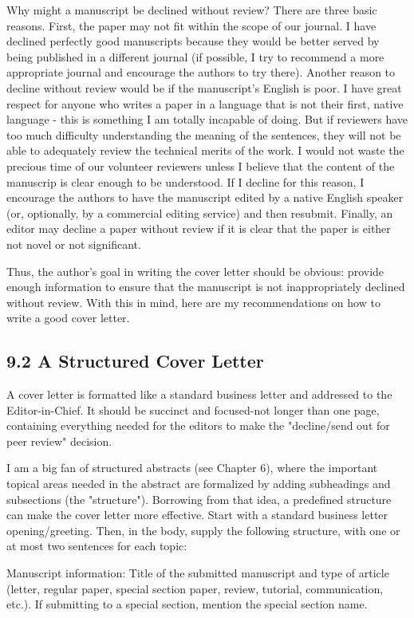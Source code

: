 Why might a manuscript be declined without review? There are three basic reasons. First, the paper may not fit within the scope of our journal. I have declined perfectly good manuscripts because they would be better served by being published in a different journal (if possible, I try to recommend a more appropriate journal and encourage the authors to try there). Another reason to decline without review would be if the manuscript's English is poor. I have great respect for anyone who writes a paper in a language that is not their first, native language - this is something I am totally incapable of doing. But if reviewers have too much difficulty understanding the meaning of the sentences, they will not be able to adequately review the technical merits of the work. I would not waste the precious time of our volunteer reviewers unless I believe that the content of the manuscrip is clear enough to be understood. If I decline for this reason, I encourage the authors to have the manuscript edited by a native English speaker (or, optionally, by a commercial editing service) and then resubmit. Finally, an editor may decline a paper without review if it is clear that the paper is either not novel or not significant.

Thus, the author's goal in writing the cover letter should be obvious: provide enough information to ensure that the manuscript is not inappropriately declined without review. With this in mind, here are my recommendations on how to write a good cover letter.

\subsection*{9.2 A Structured Cover Letter}
A cover letter is formatted like a standard business letter and addressed to the Editor-in-Chief. It should be succinct and focused-not longer than one page, containing everything needed for the editors to make the "decline/send out for peer review" decision.

I am a big fan of structured abstracts (see Chapter 6), where the important topical areas needed in the abstract are formalized by adding subheadings and subsections (the "structure"). Borrowing from that idea, a predefined structure can make the cover letter more effective. Start with a standard business letter opening/greeting. Then, in the body, supply the following structure, with one or at most two sentences for each topic:

Manuscript information: Title of the submitted manuscript and type of article (letter, regular paper, special section paper, review, tutorial, communication, etc.). If submitting to a special section, mention the special section name.

